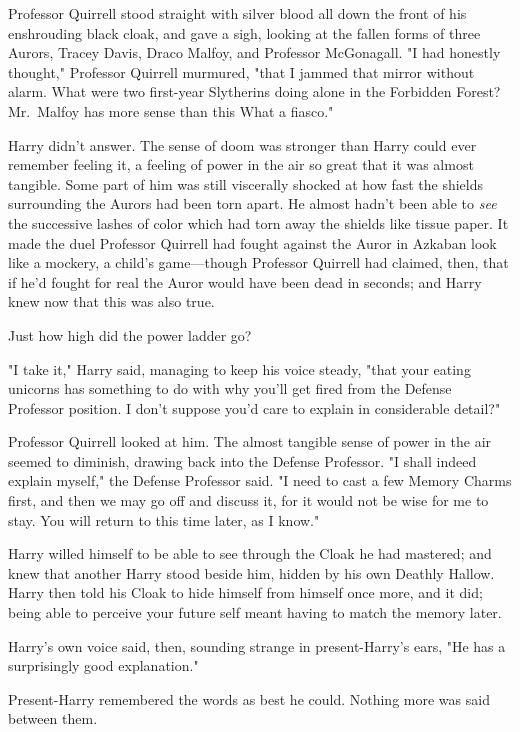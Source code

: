 Professor Quirrell stood straight with silver blood all down the front of his
enshrouding black cloak, and gave a sigh, looking at the fallen forms of three
Aurors, Tracey Davis, Draco Malfoy, and Professor McGonagall. "I had honestly
thought," Professor Quirrell murmured, "that I jammed that mirror without
alarm. What were two first-year Slytherins doing alone in the Forbidden Forest?
Mr.~Malfoy has more sense than this{\el} What a fiasco."

Harry didn't answer. The sense of doom was stronger than Harry could ever
remember feeling it, a feeling of power in the air so great that it was almost
tangible. Some part of him was still viscerally shocked at how fast the shields
surrounding the Aurors had been torn apart. He almost hadn't been able to
\emph{see} the successive lashes of color which had torn away the shields like
tissue paper. It made the duel Professor Quirrell had fought against the Auror
in Azkaban look like a mockery, a child's game---though Professor Quirrell had
claimed, then, that if he'd fought for real the Auror would have been dead in
seconds; and Harry knew now that this was also true.

Just how high did the power ladder go?

"I take it," Harry said, managing to keep his voice steady, "that your eating
unicorns has something to do with why you'll get fired from the Defense
Professor position. I don't suppose you'd care to explain in considerable
detail?"

Professor Quirrell looked at him. The almost tangible sense of power in the air
seemed to diminish, drawing back into the Defense Professor. "I shall indeed
explain myself," the Defense Professor said. "I need to cast a few Memory
Charms first, and then we may go off and discuss it, for it would not be wise
for me to stay. You will return to this time later, as I know."

Harry willed himself to be able to see through the Cloak he had mastered; and
knew that another Harry stood beside him, hidden by his own Deathly Hallow.
Harry then told his Cloak to hide himself from himself once more, and it did;
being able to perceive your future self meant having to match the memory later.

Harry's own voice said, then, sounding strange in present-Harry's ears, "He has
a surprisingly good explanation."

Present-Harry remembered the words as best he could. Nothing more was said
between them.

